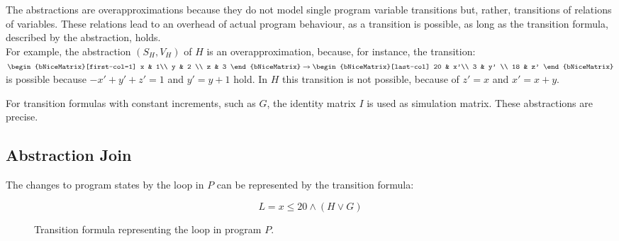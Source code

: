 The \qvasr abstractions are overapproximations because they do not model single program variable transitions but, rather, transitions of relations of variables. These relations lead to an overhead of actual program behaviour, as a transition is possible, as long as the transition formula, described by the \qvasr abstraction, holds. \\
For example, the \qvasr abstraction  $(S_H, V_H)$ of $H$ is an overapproximation, because, for instance, the transition: $\begin{bNiceMatrix}[first-col=1]  x & 1\\ y & 2 \\ z & 3 \end{bNiceMatrix} \rightarrow \begin{bNiceMatrix}[last-col]  20 & x'\\ 3 & y' \\ 18 & z' \end{bNiceMatrix}$ is possible because $-x' + y' + z' = 1$ and $y' = y + 1$ hold. In $H$ this transition is not possible, because of $z' = x$ and $x' = x + y$. \\ \par
For transition formulas with constant increments, such as $G$, the identity matrix $I$ is used as simulation matrix. These \qvasr abstractions are precise. \par

\subsection{\qvasr Abstraction Join}
The changes to program states by the loop in $P$ can be represented by the transition formula: 
\begin{figure}[H]
	\begin{equation*}
		L = x \leq 20 \land (H \lor G)
	\end{equation*}
	\caption{Transition formula representing the loop in program $P$.}
	\label{loopTF}
\end{figure}

